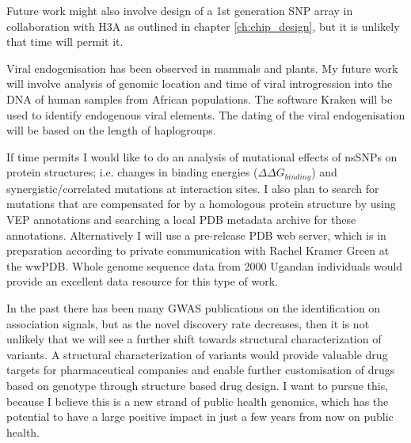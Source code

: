 Future work might also involve design of a 1st generation SNP array in collaboration with \gls{H3A} as outlined in chapter \ref{ch:chip_design}, but it is unlikely that time will permit it.

Viral endogenisation has been observed in mammals\cite{Horie2010} and plants\cite{10.1371/journal.ppat.1002146}. My future work will involve analysis of genomic location and time of viral introgression into the DNA of human samples from African populations. The software Kraken\cite{24580807} will be used to identify endogenous viral elements. The dating of the viral endogenisation will be based on the length of haplogroups.

If time permits I would like to do an analysis of mutational effects of nsSNPs on protein structures; i.e. changes in binding energies ($\Delta \Delta G_{binding}$) and synergistic/correlated mutations at interaction sites. I also plan to search for mutations that are compensated for by a homologous protein structure by using \gls{VEP} annotations and searching a local \gls{PDB} metadata archive for these annotations. Alternatively I will use a pre-release \gls{PDB} web server, which is in preparation according to private communication with Rachel Kramer Green at the \gls{wwPDB}. Whole genome sequence data from 2000 Ugandan individuals would provide an excellent data resource for this type of work.

In the past there has been many \gls{GWAS} publications on the identification on association signals, but as the novel discovery rate decreases, then it is not unlikely that we will see a further shift towards structural characterization of variants.\cite{Teng2009}\cite{Kucukkal201518} A structural characterization of variants would provide valuable drug targets for pharmaceutical companies and enable further customisation of drugs based on genotype through structure based drug design.\cite{Kuntz21081992} I want to pursue this, because I believe this is a new strand of public health genomics, which has the potential to have a large positive impact in just a few years from now on public health.